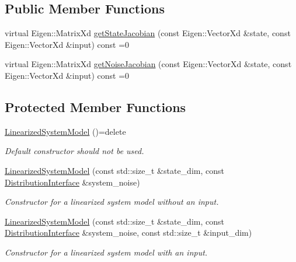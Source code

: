 \subsection*{Public Member Functions}
\begin{DoxyCompactItemize}
\item 
virtual Eigen\+::\+Matrix\+Xd \hyperlink{classrefill_1_1LinearizedSystemModel_a4a0bd58431d96f37cf52494fcbcd2d07}{get\+State\+Jacobian} (const Eigen\+::\+Vector\+Xd \&state, const Eigen\+::\+Vector\+Xd \&input) const =0
\item 
virtual Eigen\+::\+Matrix\+Xd \hyperlink{classrefill_1_1LinearizedSystemModel_a2fdc435d8e47f27ad167ff31827a1c48}{get\+Noise\+Jacobian} (const Eigen\+::\+Vector\+Xd \&state, const Eigen\+::\+Vector\+Xd \&input) const =0
\end{DoxyCompactItemize}
\subsection*{Protected Member Functions}
\begin{DoxyCompactItemize}
\item 
\hyperlink{classrefill_1_1LinearizedSystemModel_aa0c5e6dea98f7d287b8b2928a42d91fe}{Linearized\+System\+Model} ()=delete
\begin{DoxyCompactList}\small\item\em Default constructor should not be used. \end{DoxyCompactList}\item 
\hyperlink{classrefill_1_1LinearizedSystemModel_a0181615604602290af776b97ed5a9200}{Linearized\+System\+Model} (const std\+::size\+\_\+t \&state\+\_\+dim, const \hyperlink{classrefill_1_1DistributionInterface}{Distribution\+Interface} \&system\+\_\+noise)
\begin{DoxyCompactList}\small\item\em Constructor for a linearized system model without an input. \end{DoxyCompactList}\item 
\hyperlink{classrefill_1_1LinearizedSystemModel_ae8b8577bdbd47e09e076580627415358}{Linearized\+System\+Model} (const std\+::size\+\_\+t \&state\+\_\+dim, const \hyperlink{classrefill_1_1DistributionInterface}{Distribution\+Interface} \&system\+\_\+noise, const std\+::size\+\_\+t \&input\+\_\+dim)
\begin{DoxyCompactList}\small\item\em Constructor for a linearized system model with an input. \end{DoxyCompactList}\end{DoxyCompactItemize}


